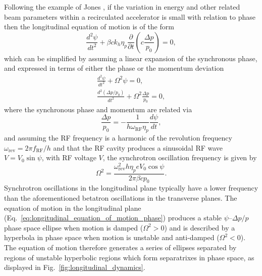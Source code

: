 \documentclass[../main.tex]{subfiles}
\begin{document}
Following the example of Jones \cite{jones2016design}, if the variation in energy and other related beam parameters within a recirculated accelerator is small with relation to phase then the longitudinal equation of motion is of the form 
\begin{equation}
\frac{d^{2}\psi}{dt^{2}} + \beta ck_{h}\eta_{p}\frac{\partial}{\partial t}\left(c\frac{\Delta p}{p_{0}}\right) = 0,
\label{eq:longitudinal_equation_of_motion}
\end{equation}
which can be simplified by assuming a linear expansion of the synchronous phase, and expressed in terms of either the phase or the momentum deviation
\begin{align}
\frac{d^{2}\psi}{dt^{2}} + \Omega^{2}\psi = 0,
\label{eq:longitudinal_equation_of_motion_phase} \\
\frac{d^{2}\left(\Delta p/p_{0}\right)}{dt^{2}} + \Omega^{2}\frac{\Delta p}{p_{0}} = 0,
\label{eq:longitudinal_equation_of_motion_momentum}
\end{align}
where the synchronous phase and momentum are related via
\begin{equation}
\frac{\Delta p}{p_{0}} = -\frac{1}{h\omega_{\mathrm{RF}}\eta_{p}}\frac{d\psi}{dt},
\label{eq:momentum_synchronous_phase_relation}    
\end{equation}
and assuming the RF frequency is a harmonic of the revolution frequency $\omega_{\mathrm{rev}}=2\pi f_{\mathrm{RF}}/h$ and that the RF cavity produces a sinusoidal RF wave $V=V_{0}\sin\psi$, with RF voltage $V$, the synchrotron oscillation frequency is given by
\begin{equation}
\Omega^{2} = \frac{\omega_{\mathrm{rev}}^{2}h\eta_{p}eV_{0}\cos\psi}{2\pi\beta cp_{0}}.
\label{eq:synchrotron_oscillation_frequency}    
\end{equation}
Synchrotron oscillations in the longitudinal plane typically have a lower frequency than the aforementioned betatron oscillations in the transverse planes. The equation of motion in the longitudinal plane (Eq.~\ref{eq:longitudinal_equation_of_motion_phase}) produces a stable $\psi$--$\Delta p/p$ phase space ellipse when motion is damped ($\Omega^{2}>0$) and is described by a hyperbola in phase space when motion is unstable and anti-damped ($\Omega^{2}<0$). The equation of motion therefore generates a series of ellipses separated by regions of unstable hyperbolic regions which form separatrixes in phase space, as displayed in Fig.~\ref{fig:longitudinal_dynamics}.
\end{document}
